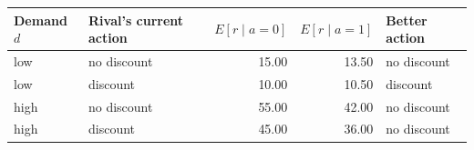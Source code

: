 \begin{tabular}{llrrl}
\toprule
Demand $d$ & Rival's current action & $E[r\mid a=0]$ & $E[r\mid a=1]$ & Better action \\
\midrule
low & no discount & 15.00 & 13.50 & no discount \\
low & discount & 10.00 & 10.50 & discount \\
high & no discount & 55.00 & 42.00 & no discount \\
high & discount & 45.00 & 36.00 & no discount \\
\bottomrule
\end{tabular}

